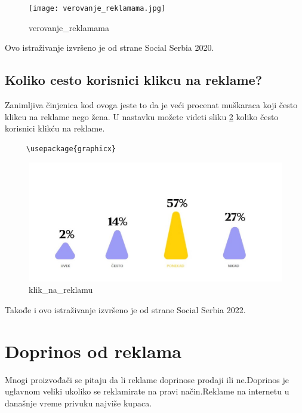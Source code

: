 \documentclass[a4paper]{article}
\begin{document}
	\begin{figure}[h!]
		\begin{center}
			\texttt{[image: verovanje\_reklamama.jpg]}
		\end{center}
		\caption{verovanje_reklamama}
		\label{fig:verovanje_reklamama}
	\end{figure}
	Ovo istraživanje izvršeno je od strane Social Serbia 2020.
	\subsection{Koliko cesto korisnici klikcu na reklame?}
	\label{subsec:klik_na_reklamu}
	Zanimljiva činjenica kod ovoga jeste to da je veći procenat muškaraca koji često klikcu na reklame nego žena. U nastavku možete videti sliku \ref{fig:klik_na_reklamu} koliko često korisnici klikću na reklame.
	\begin{verbatim}
	 \usepackage{graphicx}
	\end{verbatim}
	
	\begin{figure}[h!]
		\begin{center}
			\includegraphics[scale=0.55]{klik_na_reklamu.jpg}
		\end{center}
		\caption{klik_na_reklamu}
		\label{fig:klik_na_reklamu}
	\end{figure}
	Takođe i ovo istraživanje izvršeno je od strane Social Serbia 2022.
	\section{Doprinos od reklama}
	\label{sec:doprinos}
	Mnogi proizvođači se pitaju da li reklame doprinose prodaji ili ne.Doprinos je uglavnom veliki ukoliko se reklamirate na pravi način.Reklame na internetu u današnje vreme privuku najviše kupaca.
\end{document}
